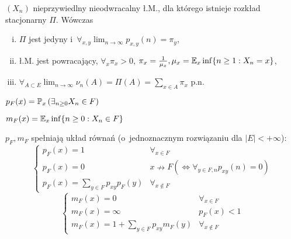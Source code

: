 	\begin{theorem}
		$(X_n)$ nieprzywiedlny nieodwracalny ł.M., dla którego istnieje
		rozkład stacjonarny $\Pi$. Wówczas
		\begin{enumerate}[(i)]
			\item $\Pi$ jest jedyny i~$\forall_{x, y} 
				\lim_{n \to \infty} p_{x,y}(n) = \pi_y$,
			\item ł.M. jest powracający, $\forall_x \pi_x >0$,
			$\pi_x = \frac1{\mu_x}, 
			\mu_x = \E_x \inf \{ n \geq 1: X_n = x \}$,
			\item $\forall_{A \subset E} \lim_{n \to \infty}
				\nu_n(A) = \Pi(A) = \sum_{x \in A} \pi_x$ p.n.
		\end{enumerate}

	\end{theorem}
	
	\begin{definition}
		$\displaystyle p_F(x) = 
			\P_x \left(\exists_{n \geq 0} X_n \in F\right)$
	\end{definition}
	
	\begin{definition}
		$m_F(x) = \E_x \inf \{ n \geq 0: X_n \in F \}$
	\end{definition}
	
	\begin{fact}
		$p_F, m_F$ spełniają układ równań (o~jednoznacznym 
		rozwiązaniu dla $|E| < + \infty$):
		$$
		\begin{cases}
			p_F (x) = 1 & \forall_{x \in F}\\
			p_F(x) = 0 & x \nrightarrow F 
			(\iff \forall_{y\in F,n} p_{xy}(n) = 0) \\
			p_F(x) = \sum_{y \in F} p_{xy} p_F(y)
				& \forall_{x \notin F}
		\end{cases}
		$$
		$$
		\begin{cases}
			m_F (x) = 0 & \forall_{x \in F}\\
			m_F(x) = \infty & p_F(x) < 1 \\
			m_F(x) = 1 + \sum_{y \in F} p_{xy} m_F(y) 
			& \forall_{x \notin F}
		\end{cases}
		$$
	\end{fact}














 
 
